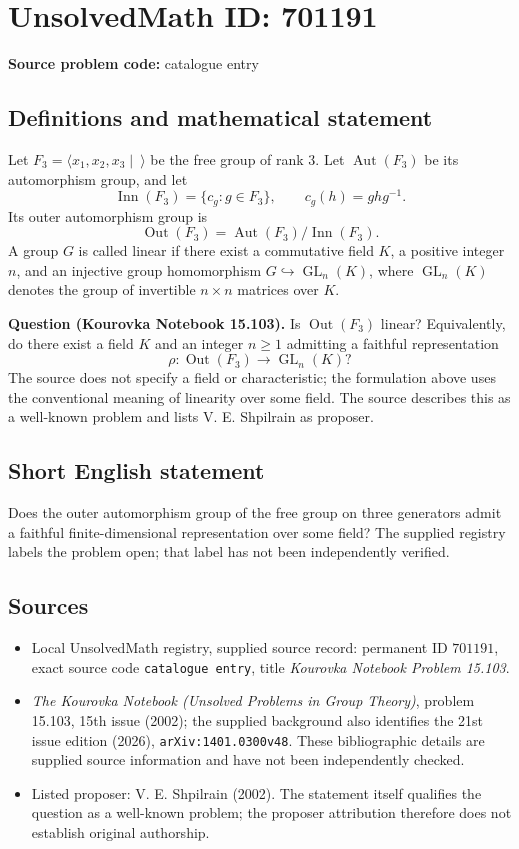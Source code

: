 \documentclass[11pt]{article}
\begin{document}
\section*{UnsolvedMath ID: 701191}
\textbf{Source problem code:} catalogue entry
\subsection{Definitions and mathematical statement}
Let \(F_3=\langle x_1,x_2,x_3\mid\ \rangle\) be the free group of rank \(3\). Let \(\operatorname{Aut}(F_3)\) be its automorphism group, and let
\[
\operatorname{Inn}(F_3)=\{c_g:g\in F_3\},\qquad c_g(h)=ghg^{-1}.
\]
Its outer automorphism group is
\[
\operatorname{Out}(F_3)=\operatorname{Aut}(F_3)/\operatorname{Inn}(F_3).
\]
A group \(G\) is called linear if there exist a commutative field \(K\), a positive integer \(n\), and an injective group homomorphism \(G\hookrightarrow\operatorname{GL}_n(K)\), where \(\operatorname{GL}_n(K)\) denotes the group of invertible \(n\times n\) matrices over \(K\).

\textbf{Question (Kourovka Notebook 15.103).} Is \(\operatorname{Out}(F_3)\) linear? Equivalently, do there exist a field \(K\) and an integer \(n\geq 1\) admitting a faithful representation
\[
\rho:\operatorname{Out}(F_3)\longrightarrow\operatorname{GL}_n(K)?
\]
The source does not specify a field or characteristic; the formulation above uses the conventional meaning of linearity over some field. The source describes this as a well-known problem and lists V. E. Shpilrain as proposer.
\subsection{Short English statement}
Does the outer automorphism group of the free group on three generators admit a faithful finite-dimensional representation over some field? The supplied registry labels the problem open; that label has not been independently verified.
\subsection{Sources}
\begin{itemize}
\item Local UnsolvedMath registry, supplied source record: permanent ID \(701191\), exact source code \texttt{catalogue entry}, title \emph{Kourovka Notebook Problem 15.103}.
\item \emph{The Kourovka Notebook (Unsolved Problems in Group Theory)}, problem 15.103, 15th issue (2002); the supplied background also identifies the 21st issue edition (2026), \texttt{arXiv:1401.0300v48}. These bibliographic details are supplied source information and have not been independently checked.
\item Listed proposer: V. E. Shpilrain (2002). The statement itself qualifies the question as a well-known problem; the proposer attribution therefore does not establish original authorship.
\end{itemize}
\end{document}
